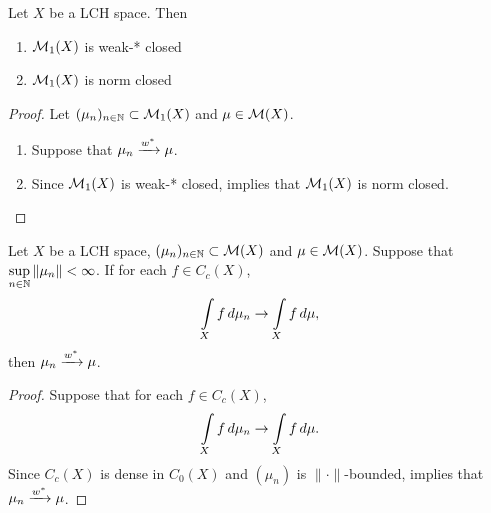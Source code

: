 \documentclass{book}
\begin{document}
	\begin{ex}
		Let $X$ be a LCH space. Then 
		\begin{enumerate}
			\item $\mathcal{M}_1(X)$ is weak-* closed 
			\item $\mathcal{M}_1(X)$ is norm closed
		\end{enumerate} 
	\end{ex}
	
	\begin{proof} Let $(\mu_n)_{n \in \mathbb{N}} \subset \mathcal{M}_1(X)$ and $\mu \in \mathcal{M}(X)$. 
		\begin{enumerate}
			\item Suppose that $\mu_n \xrightarrow{w^*} \mu$.
			\item Since $\mathcal{M}_1(X)$ is weak-* closed,  implies that $\mathcal{M}_1(X)$ is norm closed.
		\end{enumerate}
	\end{proof}
	
	\begin{ex}
		Let $X$ be a LCH space, $(\mu_n)_{n \in \mathbb{N}} \subset \mathcal{M}(X)$ and $\mu \in \mathcal{M}(X)$. Suppose that $\sup\limits_{n \in \mathbb{N}} \|\mu_n\| < \infty$. If for each $f \in C_c(X)$, 
		$$\int\limits_X f \, d \mu_n \rightarrow  \int\limits_X f \, d \mu,$$ 
		then $\mu_n \xrightarrow{w^*} \mu$.  
	\end{ex}
	
	\begin{proof}
		Suppose that for each $f \in C_c(X)$, 
		$$\int\limits_X f \, d \mu_n \rightarrow  \int\limits_X f \, d \mu.$$ 
		Since $C_c(X)$ is dense in $C_0(X)$ and $(\mu_n)$ is $\|\cdot\|$-bounded,  implies that $\mu_n \xrightarrow{w^*} \mu$.  
	\end{proof}
	
\end{document}
